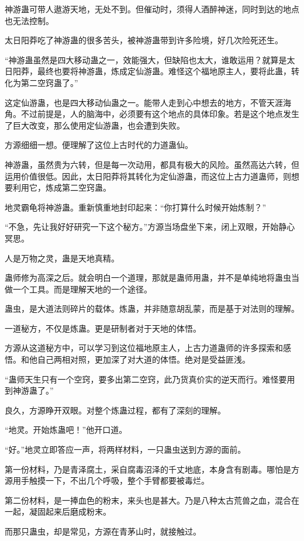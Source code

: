 \begin{this_body}
神游蛊可带人遨游天地，无处不到。但催动时，须得人酒醉神迷，同时到达的地点也无法控制。

太日阳莽吃了神游蛊的很多苦头，被神游蛊带到许多险境，好几次险死还生。

“神游蛊虽然是四大移动蛊之一，效能强大，但缺陷也太大，谁敢运用？就算是太日阳莽，最终也要将神游蛊，炼成定仙游蛊。难怪这个福地原主人，要将此蛊，转化为第二空窍蛊了。”

这定仙游蛊，也是四大移动仙蛊之一。能带人走到心中想去的地方，不管天涯海角。不过前提是，人的脑海中，必须要有这个地点的具体印象。若是这个地点发生了巨大改变，那么使用定仙游蛊，也会遭到失败。

方源细细一想。便理解了这位上古时代的力道蛊仙。

神游蛊，虽然贵为六转，但是每一次动用，都具有极大的风险。虽然高达六转，但运用价值很低。因此，太日阳莽将其转化为定仙游蛊，而这位上古力道蛊师，则想要利用它，炼成第二空窍蛊。

地灵霸龟将神游蛊。重新慎重地封印起来：“你打算什么时候开始炼制？”

“不急，先让我好好研究一下这个秘方。”方源当场盘坐下来，闭上双眼，开始静心冥思。

人是万物之灵，蛊是天地真精。

蛊师修为高深之后。就会明白一个道理，那就是蛊师用蛊，并不是单纯地将蛊虫当做一个工具。而是理解天地的一个途径。

蛊虫，是大道法则碎片的载体。炼蛊，并非随意胡乱蒙，而是基于对法则的理解。

一道秘方，不仅是炼蛊。更是研制者对于天地的体悟。

方源从这道秘方中，可以学习到这位福地原主人，上古力道蛊师的许多探索和感悟。和他自己两相对照，更加深了对大道的体悟。绝对是受益匪浅。

“蛊师天生只有一个空窍，要多出第二空窍，此乃货真价实的逆天而行。难怪要用到神游蛊了。”

良久，方源睁开双眼。对整个炼蛊过程，都有了深刻的理解。

“地灵。开始炼蛊吧！”他开口道。

“好。”地灵立即答应一声，将两样材料，一只蛊虫送到方源的面前。

第一份材料，乃是青泽腐土，采自腐毒沼泽的千丈地底，本身含有剧毒。哪怕是方源用手触摸一下，不出几个呼吸，整个手臂都要被毒烂。

第二份材料，是一捧血色的粉末，来头也是甚大。乃是八种太古荒兽之血，混合在一起，凝固起来后磨成粉末。

而那只蛊虫，却是常见，方源在青茅山时，就接触过。


\end{this_body}
